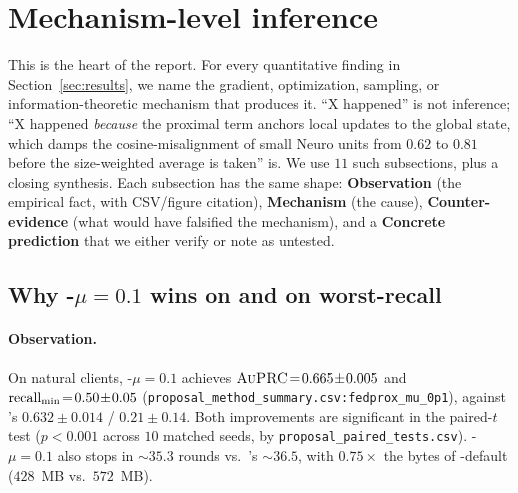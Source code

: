\section{Mechanism-level inference}
\label{sec:mechanism}

This is the heart of the report. For every quantitative finding in
Section~\ref{sec:results}, we name the gradient, optimization, sampling, or
information-theoretic mechanism that produces it. ``X happened'' is not
inference; ``X happened \emph{because} the proximal term anchors local updates
to the global state, which damps the cosine-misalignment of small Neuro units
from $0.62$ to $0.81$ before the size-weighted average is taken'' is.
We use $11$ such subsections, plus a closing synthesis. Each subsection has the
same shape: \textbf{Observation} (the empirical fact, with CSV/figure citation),
\textbf{Mechanism} (the cause), \textbf{Counter-evidence} (what would have
falsified the mechanism), and a \textbf{Concrete prediction} that we either
verify or note as untested.

\subsection{Why \fedprox{}-$\mu\!=\!0.1$ wins on \auprc{} and on worst-recall}
\label{sec:mechanism-fedprox}

\paragraph{Observation.} On natural clients, \fedprox{}-$\mu\!=\!0.1$ achieves
$\textsc{AuPRC}{} \!=\! 0.665 \!\pm\! 0.005$ and $\text{recall}_{\min}{} \!=\! 0.50 \!\pm\! 0.05$
(\texttt{proposal\_method\_summary.csv:fedprox\_mu\_0p1}), against \fedavg{}'s
$0.632 \!\pm\! 0.014$ / $0.21 \!\pm\! 0.14$. Both improvements are significant
in the paired-$t$ test ($p < 0.001$ across $10$ matched seeds, by
\texttt{proposal\_paired\_tests.csv}). \fedprox{}-$\mu\!=\!0.1$ also stops in
$\sim$$35.3$ rounds vs.\ \fedavg{}'s $\sim$$36.5$, with $0.75\!\times$ the bytes
of \fedavg{}-default ($428$~MB vs.\ $572$~MB).

